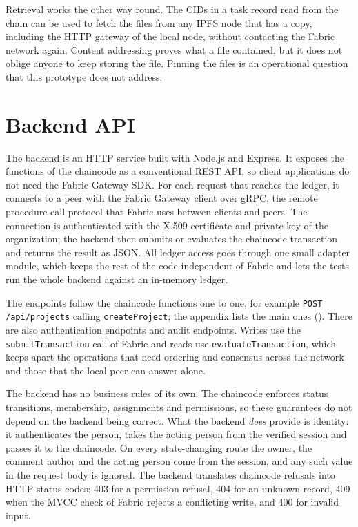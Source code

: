 Retrieval works the other way round. The CIDs in a task record read from the chain can be used to fetch the files from any IPFS node that has a copy, including the HTTP gateway of the local node, without contacting the Fabric network again. Content addressing proves what a file contained, but it does not oblige anyone to keep storing the file. Pinning the files is an operational question that this prototype does not address.

\section{Backend API}
\label{sec:backend}

The backend is an HTTP service built with Node.js and Express. It exposes the functions of the chaincode as a conventional REST API, so client applications do not need the Fabric Gateway SDK. For each request that reaches the ledger, it connects to a peer with the Fabric Gateway client over gRPC, the remote procedure call protocol that Fabric uses between clients and peers. The connection is authenticated with the X.509 certificate and private key of the organization; the backend then submits or evaluates the chaincode transaction and returns the result as JSON. All ledger access goes through one small adapter module, which keeps the rest of the code independent of Fabric and lets the tests run the whole backend against an in-memory ledger.

The endpoints follow the chaincode functions one to one, for example \texttt{POST /api/projects} calling \texttt{createProject}; the appendix lists the main ones (). There are also authentication endpoints and audit endpoints. Writes use the \texttt{submitTransaction} call of Fabric and reads use \texttt{evaluateTransaction}, which keeps apart the operations that need ordering and consensus across the network and those that the local peer can answer alone.

The backend has no business rules of its own. The chaincode enforces status transitions, membership, assignments and permissions, so these guarantees do not depend on the backend being correct. What the backend \emph{does} provide is identity: it authenticates the person, takes the acting person from the verified session and passes it to the chaincode. On every state-changing route the owner, the comment author and the acting person come from the session, and any such value in the request body is ignored. The backend translates chaincode refusals into HTTP status codes: 403 for a permission refusal, 404 for an unknown record, 409 when the MVCC check of Fabric rejects a conflicting write, and 400 for invalid input.

